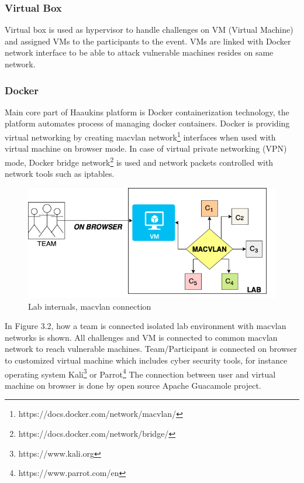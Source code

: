 \subsubsection{Virtual Box}

Virtual box is used as hypervisor to handle challenges on VM (Virtual Machine) and assigned VMs to the participants to the event. VMs are linked with Docker network interface to be able to attack vulnerable machines resides on same network. 
\subsubsection{Docker}

Main core part of Haaukins platform is Docker containerization technology, the platform automates process of managing docker containers. Docker is providing virtual networking by creating macvlan network\footnote{https://docs.docker.com/network/macvlan/} interfaces when used with virtual machine on browser mode. 
In case of virtual private networking (VPN) mode, Docker bridge network\footnote{https://docs.docker.com/network/bridge/} is used and network packets controlled with network tools such as iptables.
\begin{figure}[htbp]
\centerline{\includegraphics[scale=.4]{figures/macvlan-arch.png}}
\caption{Lab internals, macvlan connection }
\label{fig}
\end{figure}
In Figure 3.2, how a team is connected isolated lab environment with macvlan networks is shown. All challenges and VM is connected to common macvlan network to reach vulnerable machines. Team/Participant is connected on browser to customized virtual machine which includes cyber security tools, for instance operating system Kali\footnote{https://www.kali.org} or Parrot\footnote{https://www.parrot.com/en} The connection between user and virtual machine on browser is done by open source Apache Guacamole project.

